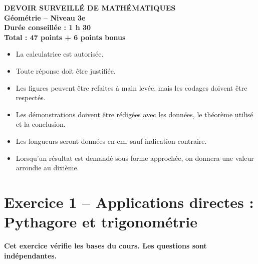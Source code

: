 \documentclass[11pt,a4paper]{article}
\begin{document}

\begin{center}
    {\Large \textbf{DEVOIR SURVEILLÉ DE MATHÉMATIQUES}}\\[0.2cm]
    {\large \textbf{Géométrie -- Niveau 3e}}\\[0.2cm]
    \textbf{Durée conseillée : 1 h 30}\\[0.2cm]
    \textbf{Total : 47 points + 6 points bonus}
\end{center}

\vspace{0.4cm}

\begin{tcolorbox}[colback=gray!5,colframe=black,title=\textbf{Consignes générales}]
\begin{itemize}
    \item La calculatrice est autorisée.
    \item Toute réponse doit être justifiée.
    \item Les figures peuvent être refaites à main levée, mais les codages doivent être respectés.
    \item Les démonstrations doivent être rédigées avec les données, le théorème utilisé et la conclusion.
    \item Les longueurs seront données en cm, sauf indication contraire.
    \item Lorsqu'un résultat est demandé sous forme approchée, on donnera une valeur arrondie au dixième.
\end{itemize}
\end{tcolorbox}

\vspace{0.5cm}

\section*{Exercice 1 -- Applications directes : Pythagore et trigonométrie}

\textbf{Cet exercice vérifie les bases du cours. Les questions sont indépendantes.}

\medskip
\end{document}
